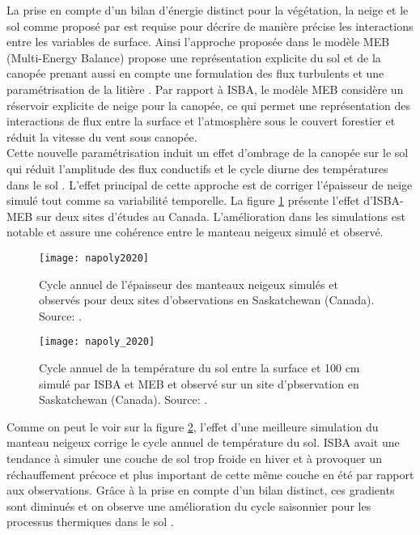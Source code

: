 La prise en compte d'un bilan d'énergie distinct pour la végétation, la neige et le sol comme proposé par \citet{boone2017} est requise pour décrire de manière précise les interactions entre les variables de surface. Ainsi l'approche proposée dans le modèle MEB (Multi-Energy Balance) propose une représentation explicite du sol et de la canopée prenant aussi en compte une formulation des flux turbulents et une paramétrisation de la litière \citep{napoly2017}. Par rapport à ISBA, le modèle MEB considère un réservoir explicite de neige pour la canopée, ce qui permet une représentation des interactions de flux entre la surface et l'atmosphère sous le couvert forestier et réduit la vitesse du vent sous canopée.\\
Cette nouvelle paramétrisation induit un effet d'ombrage de la canopée sur le sol qui réduit l'amplitude des flux conductifs et le cycle diurne des températures dans le sol \citep{napoly2020}. L'effet principal de cette approche est de corriger l'épaisseur de neige simulé tout comme sa variabilité temporelle. La figure \ref{napoly2020} présente l'effet d'ISBA-MEB sur deux sites d'études au Canada. L'amélioration dans les simulations est notable et assure une cohérence entre le manteau neigeux simulé et observé.

\begin{figure}[h!]
\texttt{[image: napoly2020]}
\caption{Cycle annuel de l'épaisseur des manteaux neigeux simulés et observés pour deux sites d'observations en Saskatchewan (Canada). Source: \citet{napoly2020}.}
\label{napoly2020}
\end{figure}

\begin{figure}[h!]
\texttt{[image: napoly\_2020]}
\caption{Cycle annuel de la température du sol entre la surface et 100 cm simulé par ISBA et MEB et observé sur un site d'pbservation en Saskatchewan (Canada). Source: \citet{napoly2020}.}
\label{napoly_2020}
\end{figure}

Comme on peut le voir sur la figure \ref{napoly_2020}, l'effet d'une meilleure simulation du manteau neigeux corrige le cycle annuel de température du sol. ISBA avait une tendance à simuler une couche de sol trop froide en hiver et à provoquer un réchauffement précoce et plus important de cette même couche en été par rapport aux observations. Grâce à la prise en compte d'un bilan distinct, ces gradients sont diminués et on observe une amélioration du cycle saisonnier pour les processus thermiques dans le sol \citep{napoly2020}.\\

